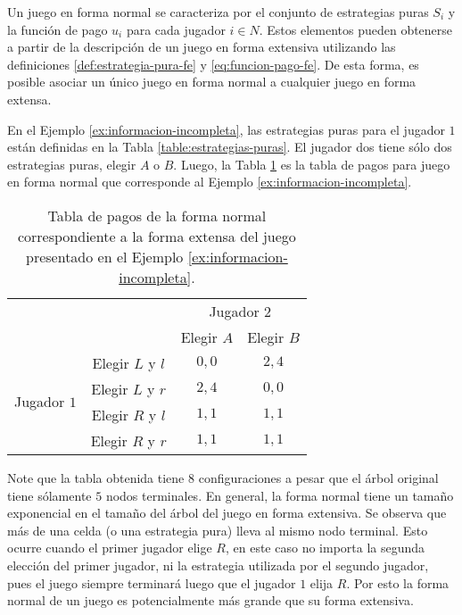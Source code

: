 Un juego en forma normal %
se caracteriza por el conjunto de estrategias puras $S_i$ y la función de pago $u_i$ para cada jugador $i\in N$. Estos elementos pueden obtenerse a partir de la descripción de un juego en forma extensiva utilizando las definiciones \ref{def:estrategia-pura-fe} y \ref{eq:funcion-pago-fe}. De esta forma, es posible asociar un único juego en forma normal a cualquier juego en forma extensa.

En el Ejemplo \ref{ex:informacion-incompleta}, las estrategias puras para el jugador $1$ están definidas en la Tabla \ref{table:estrategias-puras}. El jugador dos tiene sólo dos estrategias puras, elegir $A$ o $B$. Luego, la Tabla \ref{table:fextensiva-a-fnormal} es la tabla de pagos para juego en forma normal que corresponde al Ejemplo \ref{ex:informacion-incompleta}.

\begin{table}[hbt]
\begin{center}
\caption[Forma normal de un juego en forma extensiva]{Tabla de pagos de la forma normal correspondiente a la forma extensa del juego presentado en el Ejemplo \ref{ex:informacion-incompleta}.}
\label{table:fextensiva-a-fnormal}
\begin{tabular}{c c|c|c|}
\multicolumn{2}{c}{} & \multicolumn{2}{c}{Jugador $2$} \\ 
\multicolumn{2}{c}{} & \multicolumn{1}{c}{Elegir $A$} & \multicolumn{1}{c}{Elegir $B$} \\ \cline{3-4}
\multirow{4}{*}{Jugador $1$} & Elegir $L$ y $l$ & $0,0$ & $2,4$ \\ \cline{3-4}
& Elegir $L$ y $r$ & $2,4$ & $0,0$ \\ \cline{3-4}
& Elegir $R$ y $l$ & $1,1$ & $1,1$ \\ \cline{3-4}
& Elegir $R$ y $r$ & $1,1$ & $1,1$ \\ \cline{3-4}
\end{tabular}
\end{center}
\end{table}

Note que la tabla obtenida tiene $8$ configuraciones a pesar que el árbol original tiene sólamente $5$ nodos terminales. En general, la forma normal tiene un tamaño exponencial en el tamaño del árbol del juego en forma extensiva. Se observa que más de una celda (o una estrategia pura) lleva al mismo nodo terminal. Esto ocurre cuando el primer jugador elige $R$, en este caso no importa la segunda elección del primer jugador, ni la estrategia utilizada por el segundo jugador, pues el juego siempre terminará luego que el jugador $1$ elija $R$. Por esto la forma normal de un juego es potencialmente más grande que su forma extensiva.

